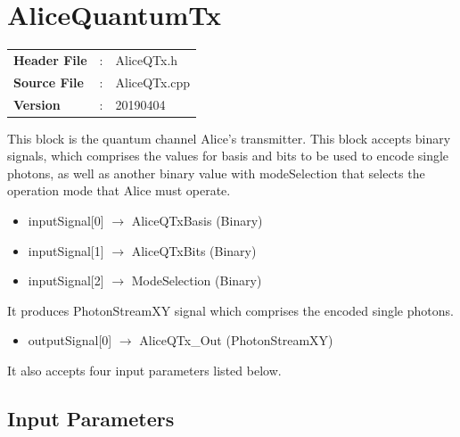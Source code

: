\clearpage

\section{AliceQuantumTx}

\begin{tcolorbox}	
\begin{tabular}{p{2.75cm} p{0.2cm} p{10.5cm}} 	
\textbf{Header File}   &:& AliceQTx.h \\
\textbf{Source File}   &:& AliceQTx.cpp \\
\textbf{Version}       &:& 20190404
\end{tabular}
\end{tcolorbox}

\maketitle
This block is the quantum channel Alice's transmitter. This block accepts binary signals, which comprises the values for basis and bits to be used to encode single photons, as well as another binary value with modeSelection that selects the operation mode that Alice must operate.
\begin{itemize}
  \item inputSignal[0] $\rightarrow$ AliceQTxBasis (Binary)
  \item inputSignal[1] $\rightarrow$ AliceQTxBits (Binary)
  \item inputSignal[2] $\rightarrow$ ModeSelection (Binary)
\end{itemize}
It produces PhotonStreamXY signal which comprises the encoded single photons.
\begin{itemize}
  \item outputSignal[0] $\rightarrow$ AliceQTx\_Out (PhotonStreamXY)
\end{itemize}
It also accepts four input parameters listed below.

\subsection*{Input Parameters}

